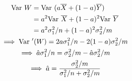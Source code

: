 \documentclass[twocolumn]{article}
\numberwithin{equation}{section}
\begin{document}
\subsection{}\begin{gather*}
\begin{aligned}
\mathrm{Var}\text{ } W
&=\mathrm{Var}\text{ }{(a\overline{X}+(1-a)\overline{Y})}\\
&=a^2 \mathrm{Var}\text{ }\overline{X}+(1-a)^2\mathrm{Var}\text{ }\overline{Y}\\
&=a^2\sigma_1^2/n+(1-a)^2\sigma_2^2/m\\
\end{aligned}\\
\implies \mathrm{Var}\text{ }{'(W)}=2a\sigma_1^2/n-2(1-a)\sigma_2^2/m\\
\implies \hat a\sigma_1^2/n=\sigma_2^2/m-\hat a\sigma_2^2/m\\
\implies \hat a=\frac{\sigma_2^2/m}{\sigma_1^2/n+\sigma_2^2/m}
\end{gather*}
\end{document}
